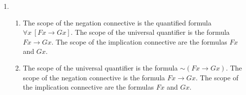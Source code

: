 \documentclass[a4paper,12pt]{article}
\newcommand{\ra}{\rightarrow}
\newcommand{\s}{\sim}
\newcommand{\all}{\forall}
\begin{document}
\begin{enumerate}[label=\arabic*,leftmargin=*]
        \item \
            \begin{enumerate}[label=(\roman*),leftmargin=*]
                \item The scope of the negation connective is the quantified formula $\all x \ [Fx \ra Gx]$. The scope of the universal quantifier is the formula $Fx \ra Gx$. The scope of the implication connective are the formulas $Fx$ and $Gx$.
                \item The scope of the universal quantifier is the formula $\s (Fx \ra Gx)$. The scope of the negation connective is the formula $Fx \ra Gx$. The scope of the implication connective are the formulas $Fx$ and $Gx$.
            \end{enumerate}

    \end{enumerate}
\end{document}
